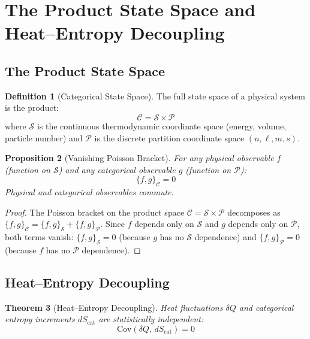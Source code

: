 \documentclass[twocolumn,10pt,a4paper]{article}
\theoremstyle{plain}
\newtheorem{theorem}{Theorem}[section]
\newtheorem{proposition}[theorem]{Proposition}
\theoremstyle{definition}
\newtheorem{definition}[theorem]{Definition}
\theoremstyle{remark}
\newcommand{\Partition}{\mathcal{P}}
\newcommand{\Cat}{\mathcal{C}}
\newcommand{\Sspace}{\mathcal{S}}
\begin{document}
\section{The Product State Space and Heat--Entropy Decoupling}
\label{sec:decoupling}

\subsection{The Product State Space}

\begin{definition}[Categorical State Space]
\label{def:product_space}
The full state space of a physical system is the product:
\begin{equation}
    \Cat = \Sspace \times \Partition
\end{equation}
where $\Sspace$ is the continuous thermodynamic coordinate space (energy, volume, particle number) and $\Partition$ is the discrete partition coordinate space $(n, \ell, m, s)$.
\end{definition}

\begin{proposition}[Vanishing Poisson Bracket]
\label{prop:poisson}
For any physical observable $f$ (function on $\Sspace$) and any categorical observable $g$ (function on $\Partition$):
\begin{equation}
    \{f, g\}_\Cat = 0
\end{equation}
Physical and categorical observables commute.
\end{proposition}

\begin{proof}
The Poisson bracket on the product space $\Cat = \Sspace \times \Partition$ decomposes as $\{f,g\}_\Cat = \{f,g\}_\Sspace + \{f,g\}_\Partition$. Since $f$ depends only on $\Sspace$ and $g$ depends only on $\Partition$, both terms vanish: $\{f,g\}_\Sspace = 0$ (because $g$ has no $\Sspace$ dependence) and $\{f,g\}_\Partition = 0$ (because $f$ has no $\Partition$ dependence).
\end{proof}

\subsection{Heat--Entropy Decoupling}

\begin{theorem}[Heat--Entropy Decoupling]
\label{thm:decoupling}
Heat fluctuations $\delta Q$ and categorical entropy increments $dS_{\mathrm{cat}}$ are statistically independent:
\begin{equation}
    \mathrm{Cov}(\delta Q, \, dS_{\mathrm{cat}}) = 0
\end{equation}
\end{theorem}
\end{document}
